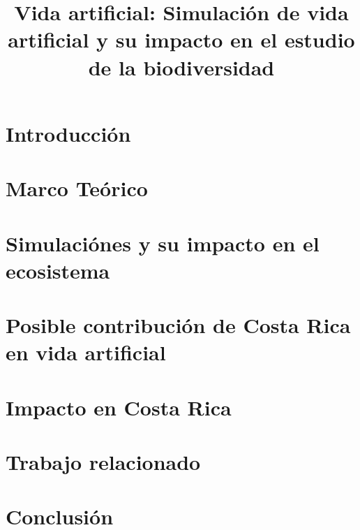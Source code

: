 \documentclass[conference]{IEEEtran}
\begin{document}
 

\title{Vida artificial: Simulaci\'on de vida artificial y su impacto en el estudio de la biodiversidad }



\author{

}


\maketitle


\begin{abstract}

\end{abstract}

\section{Introducci\'on}

\section{Marco Te\'orico}

\section{Simulaci\'ones y su impacto en el ecosistema}


\section{Posible contribuci\'on de Costa Rica en vida artificial}

\section{Impacto en Costa Rica}

\section{Trabajo relacionado}

\section{Conclusi\'on}


\nocite{*}



\end{document}
